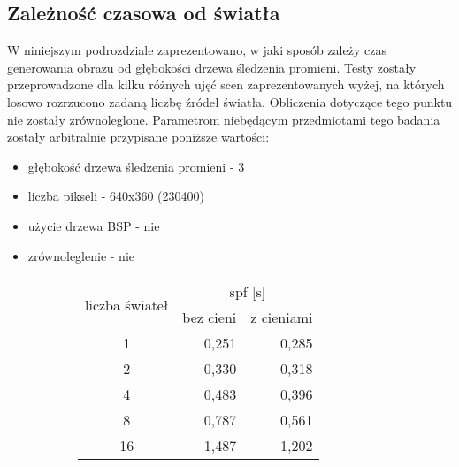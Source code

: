 \subsection{Zależność czasowa od światła}

W niniejszym podrozdziale zaprezentowano, w jaki sposób zależy czas generowania obrazu od głębokości drzewa śledzenia promieni. Testy zostały przeprowadzone dla kilku różnych ujęć scen zaprezentowanych wyżej, na których losowo rozrzucono zadaną liczbę źródeł światła. Obliczenia dotyczące tego punktu nie zostały zrównoleglone. Parametrom niebędącym przedmiotami tego badania zostały arbitralnie przypisane poniższe wartości:

\begin{itemize}

\item głębokość drzewa śledzenia promieni - 3
\item liczba pikseli - 640x360 (230400)
\item użycie drzewa BSP - nie
\item zrównoleglenie - nie

\end{itemize}

\begin{figure}[!htb]
\advance\leftskip-2cm
\begin{subfigure}{.5\textwidth}
\end{subfigure}
\hspace{2cm}
\begin{subfigure}{.5\textwidth}
		\begin{longtable}{|c|r|r|} \hline
		\multirow{2}{*}{liczba świateł} & \multicolumn{2}{|c|}{spf [s]} \\ \cline{2-3}
	    & bez cieni & z cieniami \\ \hline
	    1 & 0,251 & 0,285 \\
	    2 & 0,330 & 0,318 \\
		4 & 0,483 & 0,396 \\
		8 & 0,787 & 0,561 \\
		16 & 1,487 & 1,202 \\
		\hline
		\end{longtable}
\end{subfigure}
\end{figure}


